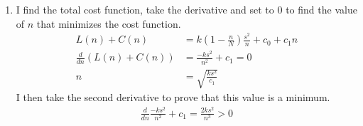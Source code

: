 \documentclass[11pt]{article}
\begin{document}
\begin{doublespace}
\begin{enumerate}
\item I find the total cost function, take the derivative and set to $0$ to find the value of $n$ that minimizes the cost function.
\begin{align*}
L(n)+C(n) &= k(1-\frac{n}{N})\frac{s^2}{n}+c_0+c_1n \\
\frac{d}{dn}(L(n)+C(n)) &= \frac{-ks^2}{n^2}+c_1 = 0\\
n &= \sqrt{\frac{ks^2}{c_1}}
\end{align*}
I then take the second derivative to prove that this value is a minimum.
\begin{align*}
\frac{d}{dn}\frac{-ks^2}{n^2}+c_1 = \frac{2ks^2}{n^3} > 0 \\
\end{align*}

\end{enumerate}

\end{doublespace}
\end{document}
